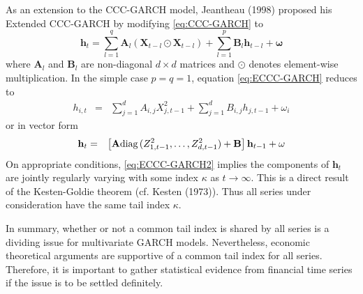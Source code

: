 \documentclass{article}
\newcommand{\1}[1]{
  \mathbf{1}_{\{#1\}}
}
\newcommand{\diag}{
  \text{diag\,}
}
\renewcommand\vec[1]{
  \mathbf{#1}
}
\newcommand\mtx[1]{
  \mathbf{#1}
}
\begin{document}
As an extension to the CCC-GARCH model, Jeantheau (1998)
\cite{jeantheau1998strong} proposed his Extended CCC-GARCH by
modifying \eqref{eq:CCC-GARCH} to
\begin{equation}
  \label{eq:ECCC-GARCH}
  \vec h_t =
  \sum_{l=1}^q \mtx A_{l} (\vec X_{t-l} \odot \vec X_{t-l})
  +
  \sum_{l=1}^p \mtx B_{l} \vec h_{t-l}
  +
  \vec \omega
\end{equation}
where $\mtx A_l$ and $\mtx B_l$ are non-diagonal $d \times d$ matrices
and $\odot$ denotes element-wise multiplication. In the simple case $p=q=1$,
equation \eqref{eq:ECCC-GARCH} reduces to
\begin{eqnarray*}
  h_{i,t} &=&
  \sum_{j=1}^d A_{i,j} X_{j, t-1}^2
  + \sum_{j=1}^d B_{i,j} h_{j, t-1}
  + \omega_i
\end{eqnarray*}
or in vector form
\begin{eqnarray}
  \vec h_t &=& \left[
    \mtx A \diag(Z_{1, t-1}^2, \dots, Z_{d, t-1}^2) + \mtx B
    \right] \vec h_{t-1} + \vec \omega
  \label{eq:ECCC-GARCH2}
\end{eqnarray}
On appropriate conditions, \eqref{eq:ECCC-GARCH2} implies the
components of $\vec h_t$ are jointly regularly varying with some index
$\kappa$ as $t \to \infty$. This is a direct result of the Kesten-Goldie
theorem (cf. Kesten (1973)\cite{Kesten1973}). Thus all series under
consideration have the same tail index $\kappa$.

In summary, whether or not a common tail index is shared by all
series is a dividing issue for multivariate GARCH
models. Nevertheless, economic theoretical arguments are supportive of
a common tail index for all series. Therefore, it is important to
gather statistical evidence from financial time series if the issue is
to be settled definitely.
\end{document}
